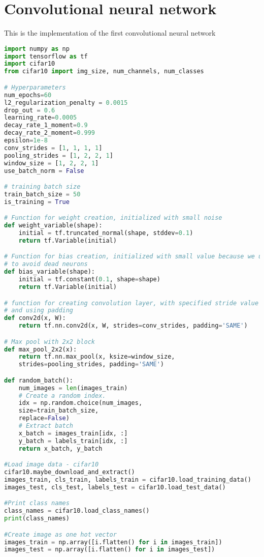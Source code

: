 \chapter{Convolutional neural network}

This is the implementation of the first convolutional neural network

\begin{lstlisting}[language=Python, label=lst:neuralnet.py, caption={neural\_net.py}, basicstyle=\tiny]
import numpy as np
import tensorflow as tf
import cifar10
from cifar10 import img_size, num_channels, num_classes

# Hyperparameters
num_epochs=60
l2_regularization_penalty = 0.0015
drop_out = 0.6
learning_rate=0.0005
decay_rate_1_moment=0.9
decay_rate_2_moment=0.999
epsilon=1e-8
conv_strides = [1, 1, 1, 1]
pooling_strides = [1, 2, 2, 1]
window_size = [1, 2, 2, 1]
use_batch_norm = False

# training batch size
train_batch_size = 50
is_training = True

# Function for weight creation, initialized with small noise
def weight_variable(shape):
	initial = tf.truncated_normal(shape, stddev=0.1)
	return tf.Variable(initial)

# Function for bias creation, initialized with small value because we use relu
# to avoid dead neurons
def bias_variable(shape):
	initial = tf.constant(0.1, shape=shape)
	return tf.Variable(initial)

# function for creating convolution layer, with specified stride value
# and using padding
def conv2d(x, W):
	return tf.nn.conv2d(x, W, strides=conv_strides, padding='SAME')

# Max pool with 2x2 block
def max_pool_2x2(x):
	return tf.nn.max_pool(x, ksize=window_size,
	strides=pooling_strides, padding='SAME')

def random_batch():
	num_images = len(images_train)
	# Create a random index.
	idx = np.random.choice(num_images,
	size=train_batch_size,
	replace=False)
	# Extract batch                           
	x_batch = images_train[idx, :]
	y_batch = labels_train[idx, :]
	return x_batch, y_batch

#Load image data - cifar10
cifar10.maybe_download_and_extract()
images_train, cls_train, labels_train = cifar10.load_training_data()
images_test, cls_test, labels_test = cifar10.load_test_data()

#Print class names
class_names = cifar10.load_class_names()
print(class_names)

#Create image as one hot vector
images_train = np.array([i.flatten() for i in images_train])
images_test = np.array([i.flatten() for i in images_test])


\end{lstlisting}
